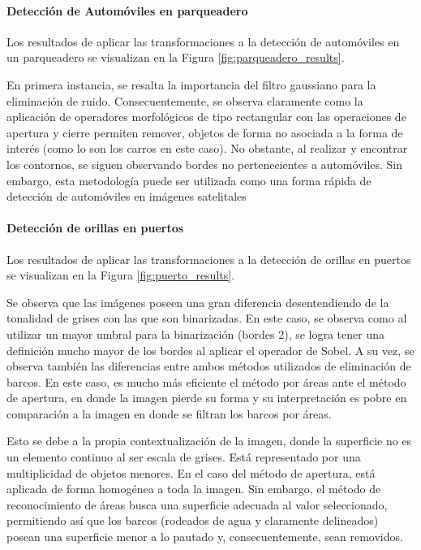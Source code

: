 \paragraph{Detección de Automóviles en parqueadero} Los resultados de aplicar las transformaciones a la detección de automóviles en un parqueadero se visualizan en la Figura \ref{fig:parqueadero_results}.

En primera instancia, se resalta la importancia del filtro gaussiano para la eliminación de ruido. Consecuentemente, se observa claramente como la aplicación de operadores morfológicos de tipo rectangular con las operaciones de apertura y cierre permiten remover, objetos de forma no asociada a la forma de interés (como lo son los carros en este caso). No obstante, al realizar  y encontrar los contornos, se siguen observando bordes no pertenecientes a automóviles. Sin embargo, esta metodología puede ser utilizada como una forma rápida de detección de automóviles en imágenes satelitales\\

\paragraph{Detección de orillas en puertos} Los resultados de aplicar las transformaciones a la detección de orillas en puertos se visualizan en la Figura \ref{fig:puerto_results}.

Se observa que las imágenes poseen una gran diferencia desentendiendo de la tonalidad de grises con las que son binarizadas. En este caso, se observa como al utilizar un mayor umbral para la binarización (bordes 2), se logra tener una definición mucho mayor de los bordes al aplicar el operador de Sobel. A su vez, se observa también las diferencias entre ambos métodos utilizados de eliminación de barcos. En este caso, es mucho más eficiente el método por áreas ante el método de apertura, en donde la imagen pierde su forma y su interpretación es pobre en comparación a la imagen en donde se filtran los barcos por áreas.

Esto se debe a la propia contextualización de la imagen, donde la superficie no es un elemento continuo al ser escala de grises. Está representado por una multiplicidad de objetos menores. En el caso del método de apertura, está aplicada de forma homogénea a toda la imagen. Sin embargo, el método de reconocimiento de áreas busca una superficie adecuada al valor seleccionado, permitiendo así que los barcos (rodeados de agua y claramente delineados) posean una superficie menor a lo pautado y, consecuentemente, sean removidos.\\

